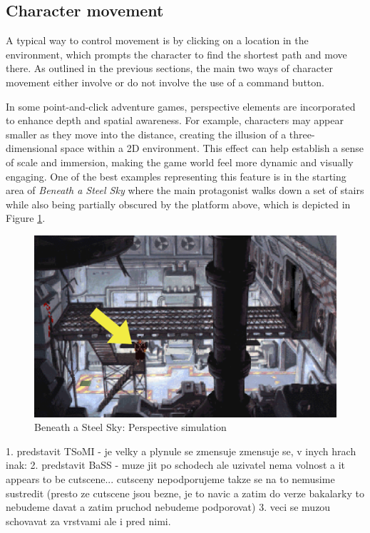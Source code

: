 \subsection{Character movement}
\label{sec:Character movement}
A typical way to control movement is by clicking on a location in the environment, which prompts the character to find the shortest path and move there. As outlined in the previous sections, the main two ways of character movement either involve or do not involve the use of a command button.

In some point-and-click adventure games, perspective elements are incorporated to enhance depth and spatial awareness. For example, characters may appear smaller as they move into the distance, creating the illusion of a three-dimensional space within a 2D environment. This effect can help establish a sense of scale and immersion, making the game world feel more dynamic and visually engaging. One of the best examples representing this feature is in the starting area of \textit{Beneath a Steel Sky} where the main protagonist walks down a set of stairs while also being partially obscured by the platform above, which is depicted in Figure \ref{fig:M-BaSS0}.

\begin{figure}[H]
\centering
\includegraphics[width=.8\linewidth]{img/M-BaSS0.png}
\caption{Beneath a Steel Sky: Perspective simulation}
\label{fig:M-BaSS0}
\end{figure}

1. predstavit TSoMI - je velky a plynule se zmensuje
zmensuje se, v inych hrach inak:
2. predstavit BaSS - muze jit po schodech ale uzivatel nema volnost a it appears to be cutscene... cutsceny nepodporujeme takze se na to nemusime sustredit (presto ze cutscene jsou bezne, je to navic a zatim do verze bakalarky to nebudeme davat a zatim pruchod nebudeme podporovat)
3. veci se muzou schovavat za vrstvami ale i pred nimi. 

